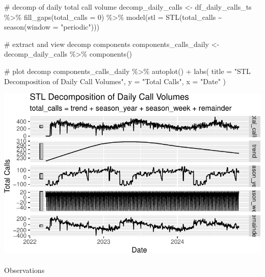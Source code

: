 \documentclass[
  letterpaper,
  DIV=11,
  numbers=noendperiod]{scrartcl}
\makeatletter
\let\oldparagraph\paragraph
\renewcommand{\paragraph}{
    \@ifstar
      \xxxParagraphStar
      \xxxParagraphNoStar
  }
\newcommand{\xxxParagraphStar}[1]{\oldparagraph*{#1}\mbox{}}
\newcommand{\xxxParagraphNoStar}[1]{\oldparagraph{#1}\mbox{}}
\newenvironment{Shaded}{\begin{snugshade}}{\end{snugshade}}
\newcommand{\AttributeTok}[1]{\textcolor[rgb]{0.40,0.45,0.13}{#1}}
\newcommand{\CommentTok}[1]{\textcolor[rgb]{0.37,0.37,0.37}{#1}}
\newcommand{\DecValTok}[1]{\textcolor[rgb]{0.68,0.00,0.00}{#1}}
\newcommand{\FunctionTok}[1]{\textcolor[rgb]{0.28,0.35,0.67}{#1}}
\newcommand{\NormalTok}[1]{\textcolor[rgb]{0.00,0.23,0.31}{#1}}
\newcommand{\OtherTok}[1]{\textcolor[rgb]{0.00,0.23,0.31}{#1}}
\newcommand{\SpecialCharTok}[1]{\textcolor[rgb]{0.37,0.37,0.37}{#1}}
\newcommand{\StringTok}[1]{\textcolor[rgb]{0.13,0.47,0.30}{#1}}
\makeatother
\begin{document}
\begin{Shaded}
\begin{Highlighting}[]
\CommentTok{\# decomp of daily total call volume}
\NormalTok{decomp\_daily\_calls }\OtherTok{\textless{}{-}}\NormalTok{ df\_daily\_calls\_ts }\SpecialCharTok{\%\textgreater{}\%}
  \FunctionTok{fill\_gaps}\NormalTok{(}\AttributeTok{total\_calls =} \DecValTok{0}\NormalTok{) }\SpecialCharTok{\%\textgreater{}\%}
  \FunctionTok{model}\NormalTok{(}\AttributeTok{stl =} \FunctionTok{STL}\NormalTok{(total\_calls }\SpecialCharTok{\textasciitilde{}} \FunctionTok{season}\NormalTok{(}\AttributeTok{window =} \StringTok{"periodic"}\NormalTok{)))}

\CommentTok{\# extract and view decomp components}
\NormalTok{components\_calls\_daily }\OtherTok{\textless{}{-}}\NormalTok{ decomp\_daily\_calls }\SpecialCharTok{\%\textgreater{}\%}
  \FunctionTok{components}\NormalTok{()}

\CommentTok{\# plot decomp}
\NormalTok{components\_calls\_daily }\SpecialCharTok{\%\textgreater{}\%}
  \FunctionTok{autoplot}\NormalTok{() }\SpecialCharTok{+}
  \FunctionTok{labs}\NormalTok{(}
    \AttributeTok{title =} \StringTok{"STL Decomposition of Daily Call Volumes"}\NormalTok{, }
    \AttributeTok{y =} \StringTok{"Total Calls"}\NormalTok{, }
    \AttributeTok{x =} \StringTok{"Date"}
\NormalTok{  )}
\end{Highlighting}
\end{Shaded}

\includegraphics{final_proj_group1_files/figure-pdf/daily-3.pdf}

\paragraph{Observations}\label{observations-4}
\end{document}
